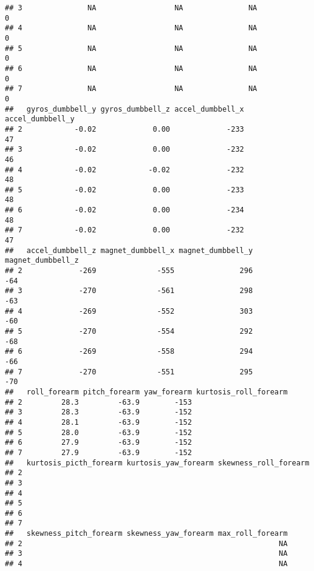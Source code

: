 \documentclass[]{article}
\begin{document}
\begin{verbatim}
## 3               NA                  NA               NA                0
## 4               NA                  NA               NA                0
## 5               NA                  NA               NA                0
## 6               NA                  NA               NA                0
## 7               NA                  NA               NA                0
##   gyros_dumbbell_y gyros_dumbbell_z accel_dumbbell_x accel_dumbbell_y
## 2            -0.02             0.00             -233               47
## 3            -0.02             0.00             -232               46
## 4            -0.02            -0.02             -232               48
## 5            -0.02             0.00             -233               48
## 6            -0.02             0.00             -234               48
## 7            -0.02             0.00             -232               47
##   accel_dumbbell_z magnet_dumbbell_x magnet_dumbbell_y magnet_dumbbell_z
## 2             -269              -555               296               -64
## 3             -270              -561               298               -63
## 4             -269              -552               303               -60
## 5             -270              -554               292               -68
## 6             -269              -558               294               -66
## 7             -270              -551               295               -70
##   roll_forearm pitch_forearm yaw_forearm kurtosis_roll_forearm
## 2         28.3         -63.9        -153                      
## 3         28.3         -63.9        -152                      
## 4         28.1         -63.9        -152                      
## 5         28.0         -63.9        -152                      
## 6         27.9         -63.9        -152                      
## 7         27.9         -63.9        -152                      
##   kurtosis_picth_forearm kurtosis_yaw_forearm skewness_roll_forearm
## 2                                                                  
## 3                                                                  
## 4                                                                  
## 5                                                                  
## 6                                                                  
## 7                                                                  
##   skewness_pitch_forearm skewness_yaw_forearm max_roll_forearm
## 2                                                           NA
## 3                                                           NA
## 4                                                           NA

\end{verbatim}
\end{document}
